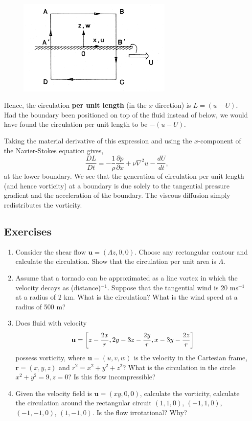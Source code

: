 \documentclass[twoside,a4paper,11pt]{report}
\begin{document}
\begin{figure}
\centerline{\includegraphics[width=3in]{Section48.pdf}}
\label{fig8}
\end{figure}

Hence, the circulation \textbf{per unit length} (in the $x$ direction) is $L = 
\left( {u-U} \right)$. Had the boundary been positioned on top of the fluid 
instead of below, we would have found the circulation per unit length to be 
$-\left( {u-U} \right)$. 

Taking the material derivative of this expression and using the $x$-component 
of the Navier-Stokes equation gives, 
\[
\frac{DL}{Dt}=-\frac{1}{\rho }\frac{\partial p}{\partial x}+\nu \nabla 
^2u-\frac{dU}{dt},
\]
at the lower boundary. We see that the generation of circulation per unit 
length (and hence vorticity) at a boundary is due solely to the tangential 
pressure gradient and the acceleration of the boundary. The viscous 
diffusion simply redistributes the vorticity.

\subsection*{Exercises}
\begin{enumerate}
\item Consider the shear flow $\textbf{u} = (\Lambda z, 0, 0)$. Choose any 
rectangular contour and calculate the circulation. Show that the circulation 
per unit area is $\Lambda $.

\item Assume that a tornado can be approximated as a line vortex in which the 
velocity decays as (distance)$^{-1}$. Suppose that the tangential wind is 20 
ms$^{-1}$ at a radius of 2 km. What is the circulation? What is the wind 
speed at a radius of 500 m?

\item Does fluid with velocity
\[
{{\bf u}}=\left[ {z-\frac{2x}{r},2y-3z-\frac{2y}{r},x-3y-\frac{2z}{r}} 
\right]
\]
possess vorticity, where $\textbf{u} = (u,v,w)$ is the velocity in the 
Cartesian frame, $\textbf{r} = (x,y,z)$ and $r^{2} = x^{2} +y^{2} + 
z^{2}$? What is the circulation in the circle $x^{2} + y^{2} = 9, z = 0$? 
Is this flow incompressible?

\item Given the velocity field is $\textbf{u} = (xy, 0, 0)$,  calculate the vorticity,
calculate the circulation around the rectangular circuit $(1,1,0)$, $(-1,1,0)$, 
$(-1,-1,0)$, $(1,-1,0)$. Is the flow irrotational? Why?
\end{enumerate}
\end{document}
